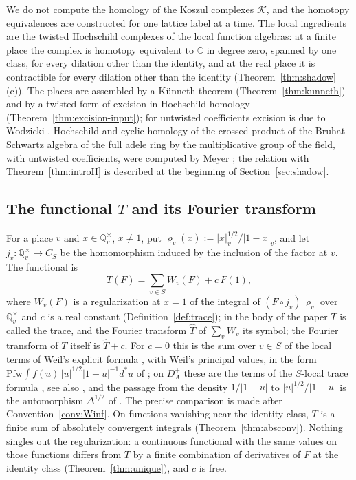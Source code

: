 \documentclass[11pt]{amsart}
\theoremstyle{definition}
\theoremstyle{remark}
\newcommand{\C}{\mathbb C}
\newcommand{\Q}{\mathbb Q}
\begin{document}
We do not compute the homology of the Koszul complexes $\mathcal K$, and the
homotopy equivalences are constructed for one lattice label at a time.  The
local ingredients are the twisted Hochschild complexes of the local function
algebras: at a finite place the complex is homotopy equivalent to $\C$ in
degree zero, spanned by one class, for every dilation other than the identity, and at the real place
it is contractible for every dilation other than the identity
(Theorem~\ref{thm:shadow}(c)).  The places are assembled by a K\"unneth
theorem (Theorem~\ref{thm:kunneth}) and by a twisted form of excision in
Hochschild homology (Theorem~\ref{thm:excision-input}); for untwisted
coefficients excision is due to Wodzicki \cite{Wodzicki}.  Hochschild and
cyclic homology of the crossed product of the Bruhat--Schwartz algebra of the
full adele ring by the multiplicative group of the field, with untwisted
coefficients, were computed by Meyer \cite{MeyerCrossed}; the relation with
Theorem~\ref{thm:introH} is described at the beginning of
Section~\ref{sec:shadow}.

\subsection*{The functional $T$ and its Fourier transform}

For a place $v$ and $x\in\Q_v^{\times}$, $x\ne1$, put
$\varrho_v(x):=|x|_v^{1/2}/|1-x|_v$, and let $j_v:\Q_v^{\times}\to C_S$ be the
homomorphism induced by the inclusion of the factor at $v$.  The functional
is
\[
T(F)=\sum_{v\in S}W_v(F)+c\,F(1),
\]
where $W_v(F)$ is a regularization at $x=1$ of the integral of
$(F\circ j_v)\,\varrho_v$ over $\Q_v^{\times}$ and $c$ is a real constant
(Definition~\ref{def:trace}); in the body of the paper $T$ is called the
trace, and the Fourier transform $\widehat T$ of $\sum_vW_v$ its symbol; the
Fourier transform of $T$ itself is $\widehat T+c$.  For $c=0$ this is the sum over $v\in S$ of the
local terms of Weil's explicit formula \cite{Weil1952}, with Weil's
principal values, in the form
$\mathrm{Pfw}\!\int f(u)\,|u|^{1/2}|1-u|^{-1}d^{*}u$ of
\cite[Appendix~II]{Connes99}; on $D_A^{+}$ these are the terms of the
$S$-local trace formula \cite[Theorem~4]{Connes99}, see also
\cite[Section~3]{MeyerIdele}, and the passage from the density
$1/|1-u|$ to $|u|^{1/2}/|1-u|$ is the automorphism $\Delta^{1/2}$ of
\cite[Introduction]{CCWeilArch}.  The precise comparison is made after
Convention~\ref{conv:Winf}.  On functions vanishing near the identity class,
$T$ is a finite sum of absolutely convergent integrals
(Theorem~\ref{thm:absconv}).  Nothing singles out the regularization: a
continuous functional with the same values on those functions differs from
$T$ by a finite combination of derivatives of $F$ at the identity class
(Theorem~\ref{thm:unique}), and $c$ is free.
\end{document}
